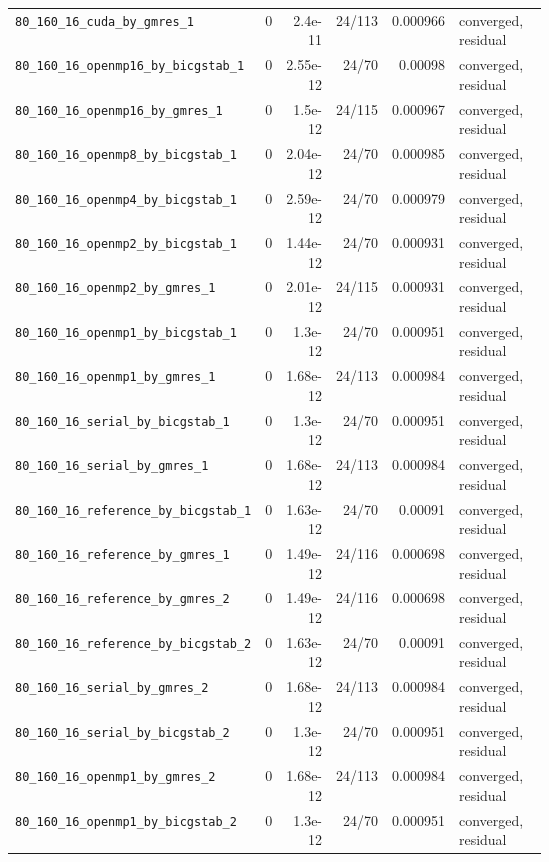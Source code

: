 \documentclass[11pt]{article}
\begin{document}
\begin{longtable}{p{0.40\linewidth}rrrrp{0.22\linewidth}}
\nolinkurl{80_160_16_cuda_by_gmres_1} & 0 & 2.4e-11 & 24/113 & 0.000966 & converged, residual\\
\nolinkurl{80_160_16_openmp16_by_bicgstab_1} & 0 & 2.55e-12 & 24/70 & 0.00098 & converged, residual\\
\nolinkurl{80_160_16_openmp16_by_gmres_1} & 0 & 1.5e-12 & 24/115 & 0.000967 & converged, residual\\
\nolinkurl{80_160_16_openmp8_by_bicgstab_1} & 0 & 2.04e-12 & 24/70 & 0.000985 & converged, residual\\
\nolinkurl{80_160_16_openmp4_by_bicgstab_1} & 0 & 2.59e-12 & 24/70 & 0.000979 & converged, residual\\
\nolinkurl{80_160_16_openmp2_by_bicgstab_1} & 0 & 1.44e-12 & 24/70 & 0.000931 & converged, residual\\
\nolinkurl{80_160_16_openmp2_by_gmres_1} & 0 & 2.01e-12 & 24/115 & 0.000931 & converged, residual\\
\nolinkurl{80_160_16_openmp1_by_bicgstab_1} & 0 & 1.3e-12 & 24/70 & 0.000951 & converged, residual\\
\nolinkurl{80_160_16_openmp1_by_gmres_1} & 0 & 1.68e-12 & 24/113 & 0.000984 & converged, residual\\
\nolinkurl{80_160_16_serial_by_bicgstab_1} & 0 & 1.3e-12 & 24/70 & 0.000951 & converged, residual\\
\nolinkurl{80_160_16_serial_by_gmres_1} & 0 & 1.68e-12 & 24/113 & 0.000984 & converged, residual\\
\nolinkurl{80_160_16_reference_by_bicgstab_1} & 0 & 1.63e-12 & 24/70 & 0.00091 & converged, residual\\
\nolinkurl{80_160_16_reference_by_gmres_1} & 0 & 1.49e-12 & 24/116 & 0.000698 & converged, residual\\
\nolinkurl{80_160_16_reference_by_gmres_2} & 0 & 1.49e-12 & 24/116 & 0.000698 & converged, residual\\
\nolinkurl{80_160_16_reference_by_bicgstab_2} & 0 & 1.63e-12 & 24/70 & 0.00091 & converged, residual\\
\nolinkurl{80_160_16_serial_by_gmres_2} & 0 & 1.68e-12 & 24/113 & 0.000984 & converged, residual\\
\nolinkurl{80_160_16_serial_by_bicgstab_2} & 0 & 1.3e-12 & 24/70 & 0.000951 & converged, residual\\
\nolinkurl{80_160_16_openmp1_by_gmres_2} & 0 & 1.68e-12 & 24/113 & 0.000984 & converged, residual\\
\nolinkurl{80_160_16_openmp1_by_bicgstab_2} & 0 & 1.3e-12 & 24/70 & 0.000951 & converged, residual\\

\end{longtable}
\end{document}
